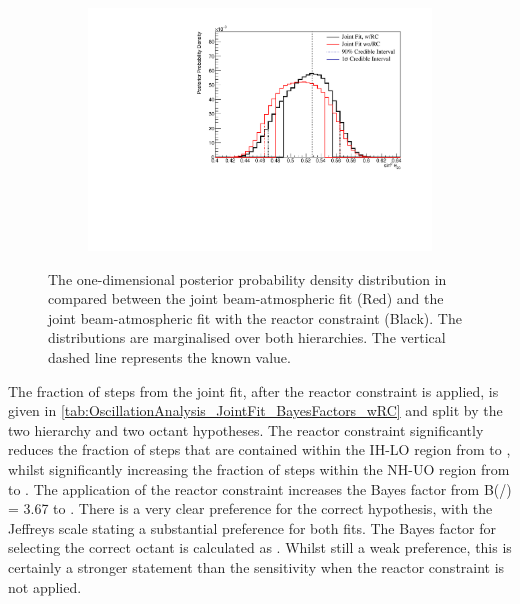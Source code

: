 \begin{figure}[h]
  \begin{subfigure}[t]{0.91\textwidth}
    \includegraphics[width=\textwidth, trim={0mm 0mm 0mm 0mm}, clip,page=1]{Figures/OA/JointFit_wRC_Comp/ContourComparison_1D_th23_BH_2_wRC_woRC_UnSmeared_CredibleInterval.pdf}
  \end{subfigure}
  \caption{The one-dimensional posterior probability density distribution in  compared between the joint beam-atmospheric fit (Red) and the joint beam-atmospheric fit with the reactor constraint (Black). The distributions are marginalised over both hierarchies. The vertical dashed line represents the known value.}
  \label{fig:OscillationAnalysis_JointFit_wRC_Comp_TH23}
\end{figure}

\clearpage

The fraction of steps from the joint fit, after the reactor constraint is applied, is given in \autoref{tab:OscillationAnalysis_JointFit_BayesFactors_wRC} and split by the two hierarchy and two octant hypotheses. The reactor constraint significantly reduces the fraction of steps that are contained within the IH-LO region from  to , whilst significantly increasing the fraction of steps within the NH-UO region from  to . The application of the reactor constraint increases the Bayes factor from {B(/) = 3.67} to . There is a very clear preference for the correct hypothesis, with the Jeffreys scale stating a substantial preference for both fits. The Bayes factor for selecting the correct octant is calculated as . Whilst still a weak preference, this is certainly a stronger statement than the sensitivity when the reactor constraint is not applied.

